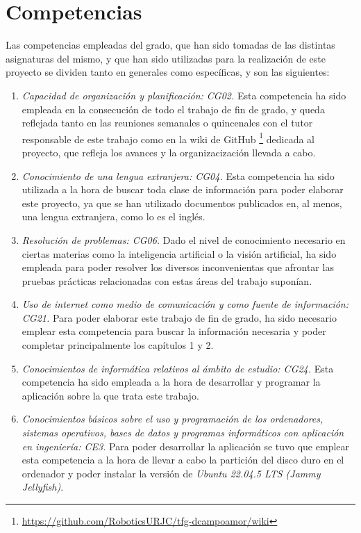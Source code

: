 \section{Competencias}
\label{sec:competencias}

Las competencias empleadas del grado, que han sido tomadas de las distintas asignaturas del mismo, y que han sido utilizadas para la realización de este proyecto se dividen tanto en generales como específicas, y son las siguientes:

\begin{enumerate} 
  \item \textit{Capacidad de organización y planificación: CG02.} Esta competencia ha sido empleada en la consecución de todo el trabajo de fin de grado, y queda reflejada tanto en las reuniones semanales o quincenales con el tutor responsable de este trabajo como en la wiki de GitHub \footnote{\url{https://github.com/RoboticsURJC/tfg-dcampoamor/wiki}} dedicada al proyecto, que refleja los avances y la organizacización llevada a cabo.  
  \item \textit{Conocimiento de una lengua extranjera: CG04.} Esta competencia ha sido utilizada a la hora de buscar toda clase de información para poder elaborar este proyecto, ya que se han utilizado documentos publicados en, al menos, una lengua extranjera, como lo es el inglés.
  \item \textit{Resolución de problemas: CG06.} Dado el nivel de conocimiento necesario en ciertas materias como la inteligencia artificial o la visión artificial, ha sido empleada para poder resolver los diversos inconvenientas que afrontar las pruebas prácticas relacionadas con estas áreas del trabajo suponían.
  \item \textit{Uso de internet como medio de comunicación y como fuente de información: CG21.} Para poder elaborar este trabajo de fin de grado, ha sido necesario emplear esta competencia para buscar la información necesaria y poder completar principalmente los capítulos 1 y 2.
  \item \textit{Conocimientos de informática relativos al ámbito de estudio: CG24.} Esta competencia ha sido empleada a la hora de desarrollar y programar la aplicación sobre la que trata este trabajo.
  \item \textit{Conocimientos básicos sobre el uso y programación de los ordenadores, sistemas operativos, bases de datos y programas informáticos con aplicación en ingeniería: CE3.} Para poder desarrollar la aplicación se tuvo que emplear esta competencia a la hora de llevar a cabo la partición del disco duro en el ordenador y poder instalar la versión de \textit{Ubuntu 22.04.5 LTS (Jammy Jellyfish)}.  

\end{enumerate}

